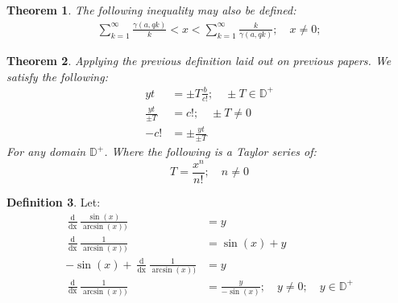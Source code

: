 \documentclass[10pt, twocolumn]{article}
\theoremstyle{plain}
\newtheorem{theorem}{Theorem}[section]
\theoremstyle{definition}
\newtheorem{definition}[theorem]{Definition}
\theoremstyle{remark}
\begin{document}
	\begin{theorem}
		The following inequality may also be defined:
		\begin{align*}
			\sum_{k=1}^{\infty} \frac{\gamma(a, qk)}{k} < x < \sum_{k=1}^{\infty} \frac{k}{\gamma(a, qk)}; \quad x \neq 0;
		\end{align*}
	\end{theorem}
	
	\begin{theorem}
		Applying the previous definition laid out on previous papers. We satisfy the following:
		\begin{align*}
			yt &= \pm T \frac{b}{c!}; \quad \pm T \in \mathbb{D}^{+}\\
			\frac{yt}{\pm T} &= c!; \quad \pm T \neq 0\\
			-c! &= \pm \frac{yt}{\pm T}
		\end{align*}
		For any domain $\mathbb{D}^{+}$. Where the following is a Taylor series of:
		\begin{equation}
			T = \frac{x^n}{n!}; \quad n \neq 0
		\end{equation}
	\end{theorem}
	
	\begin{definition}
		Let:
		\begin{align*}
			\frac{\operatorname{d}}{\operatorname{dx}} \frac{\sin(x)}{\arcsin(x))}&=y\\
			\frac{\operatorname{d}}{\operatorname{dx}} \frac{1}{\arcsin(x))} &= \sin(x) + y\\
			-\sin(x)+\frac{\operatorname{d}}{\operatorname{dx}}\frac{1}{\arcsin(x))}&=y\\
			\frac{\operatorname{d}}{\operatorname{dx}}\frac{1}{\arcsin(x))}&=\frac{y}{-\sin(x)}; \quad y \neq 0; \quad y \in \mathbb{D}^{+}
		\end{align*}
	\end{definition}
	
	\nocite{*}
	
	
	
	
\end{document}
